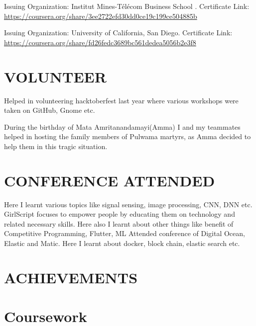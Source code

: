 \documentclass[11pt,a4paper,sans]{moderncv}        %
\begin{document}
{Issuing Organization: Institut Mines-Télécom Business School .{\newline}
Certificate Link: 
\url{https://coursera.org/share/3ee2722efd30dd0ce19c199ce504885b}}{}

{Issuing Organization: University of California, San Diego.{\newline}
Certificate Link:
\url{https://coursera.org/share/fd26fedc3689bc561dedea5056b2e3f8}}{}



\section{VOLUNTEER}
{Helped in volunteering  hacktoberfest last year where various workshops were taken on GitHub, Gnome etc. }

{During the birthday of Mata Amritanandamayi(Amma) I and my teammates helped in hosting the family members of Pulwama martyrs, as Amma decided to help them in this tragic situation.  }


\section{CONFERENCE ATTENDED}
{Here I learnt various topics like signal sensing, image processing, CNN, DNN etc.}
{GirlScript focuses to empower people by educating them on technology and related necessary skills. Here also I learnt about other things like benefit of Competitive Programming, Flutter, ML}
{Attended conference of Digital Ocean, Elastic and Matic. Here I learnt about docker, block chain, elastic search etc. }

\section{ACHIEVEMENTS}

\section{Coursework}
\end{document}
